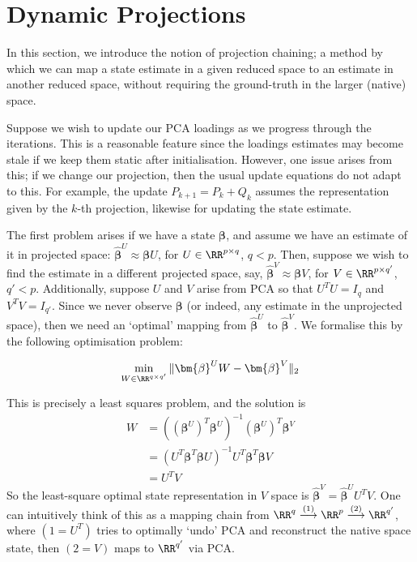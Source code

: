 \section{Dynamic Projections}
In this section, we introduce the notion of projection chaining; a method by which we can map a state estimate in a given reduced space to an estimate in another reduced space, without requiring the ground-truth in the larger (native) space.

Suppose we wish to update our PCA loadings as we progress through the iterations. This is a reasonable feature since the loadings estimates may become stale if we keep them static after initialisation. However, one issue arises from this; if we change our projection, then the usual update equations do not adapt to this. For example, the update $P_{k+1}=P_k+Q_k$ assumes the representation given by the $k$-th projection, likewise for updating the state estimate. 

The first problem arises if we have a state $\bm{\beta}$, and assume we have an estimate of it in projected space: $\hat{\bm{\beta}}^U \approx \bm{\beta}U$, for $U \in \RR^{p \times q}$, $q<p$. Then, suppose we wish to find the estimate in a different projected space, say, $\hat{\bm{\beta}}^V \approx \bm{\beta}V$, for $V\in \RR^{p \times q'}$, $q' < p$. Additionally, suppose $U$ and $V$ arise from PCA so that $U^TU = I_q$ and $V^T V = I_{q'}$. Since we never observe $\bm{\beta}$ (or indeed, any estimate in the unprojected space), then we need an `optimal' mapping from $\hat{\bm{\beta}}^U$ to $\hat{\bm{\beta}}^V$. We formalise this by the following optimisation problem:

\[
\min_{W\in \RR^{q\times q'}}\|\bm{\beta}^UW-\bm{\beta}^V\|_2    
\]

This is precisely a least squares problem, and the solution is 
\begin{align*}
    W &= ((\bm{\beta}^U)^T\bm{\beta}^U)^{-1}(\bm{\beta}^U)^T \bm{\beta}^V \\
    &= (U^T \bm{\beta}^T \bm{\beta} U)^{-1} U^T \bm{\beta}^T\bm{\beta} V \\
    &= U^T V
\end{align*}
So the least-square optimal state representation in $V$ space is $\hat{\bm{\beta}}^V = \bm{\hat{\beta}}^U U^T V$. One can intuitively think of this as a mapping chain from $\RR^q \stackrel{(1)}{\longrightarrow} \RR^p \stackrel{(2)}{\longrightarrow} \RR^{q'}$, where $(1=U^T)$ tries to optimally `undo' PCA and reconstruct the native space state, then $(2=V)$ maps to $\RR^{q'}$ via PCA.

